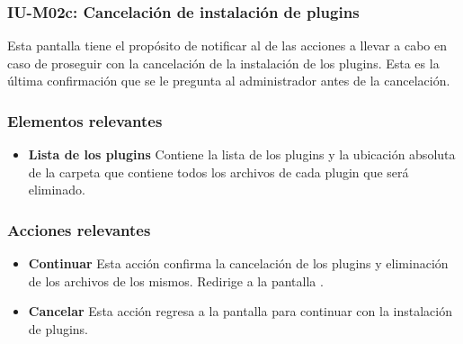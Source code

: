 
\subsubsection{IU-M02c: Cancelación de instalación de plugins}

 Esta pantalla tiene el propósito de notificar al  de las acciones a
 llevar a cabo en caso de proseguir con la cancelación de la instalación de los plugins. Esta es
 la última confirmación que se le pregunta al administrador antes de la cancelación.


\subsubsection{Elementos relevantes}

    \begin{itemize}
    \item {\bf Lista de los plugins}
        Contiene la lista de los plugins y la ubicación absoluta de la carpeta
        que contiene todos los archivos de cada plugin que será eliminado.
    \end{itemize}

\subsubsection{Acciones relevantes}

    \begin{itemize}
    \item {\bf Continuar}
        Esta acción confirma la cancelación de los plugins y eliminación de los
        archivos de los mismos. Redirige a la pantalla .

    \item {\bf Cancelar}
        Esta acción regresa a la pantalla  para continuar con la instalación
        de plugins.
    \end{itemize}

\clearpage

